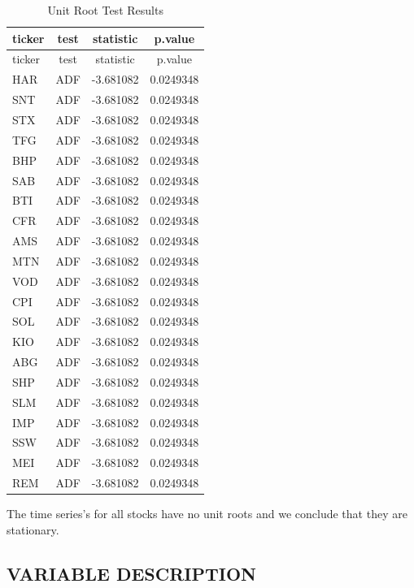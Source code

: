 \documentclass[
]{article}
\begin{document}
\begin{longtable}[]{@{}lccc@{}}
\caption{Unit Root Test Results}\tabularnewline
\toprule()
ticker & test & statistic & p.value \\
\midrule()
\endfirsthead
\toprule()
ticker & test & statistic & p.value \\
\midrule()
\endhead
HAR & ADF & -3.681082 & 0.0249348 \\
SNT & ADF & -3.681082 & 0.0249348 \\
STX & ADF & -3.681082 & 0.0249348 \\
TFG & ADF & -3.681082 & 0.0249348 \\
BHP & ADF & -3.681082 & 0.0249348 \\
SAB & ADF & -3.681082 & 0.0249348 \\
BTI & ADF & -3.681082 & 0.0249348 \\
CFR & ADF & -3.681082 & 0.0249348 \\
AMS & ADF & -3.681082 & 0.0249348 \\
MTN & ADF & -3.681082 & 0.0249348 \\
VOD & ADF & -3.681082 & 0.0249348 \\
CPI & ADF & -3.681082 & 0.0249348 \\
SOL & ADF & -3.681082 & 0.0249348 \\
KIO & ADF & -3.681082 & 0.0249348 \\
ABG & ADF & -3.681082 & 0.0249348 \\
SHP & ADF & -3.681082 & 0.0249348 \\
SLM & ADF & -3.681082 & 0.0249348 \\
IMP & ADF & -3.681082 & 0.0249348 \\
SSW & ADF & -3.681082 & 0.0249348 \\
MEI & ADF & -3.681082 & 0.0249348 \\
REM & ADF & -3.681082 & 0.0249348 \\
\bottomrule()
\end{longtable}

The time series's for all stocks have no unit roots and we conclude that
they are stationary.

\hypertarget{variable-description}{%
\subsection{VARIABLE DESCRIPTION}\label{variable-description}}
\end{document}
